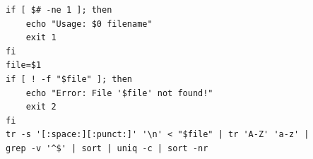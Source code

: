\begin{verbatim}
if [ $# -ne 1 ]; then
    echo "Usage: $0 filename"
    exit 1
fi
file=$1
if [ ! -f "$file" ]; then
    echo "Error: File '$file' not found!"
    exit 2
fi
tr -s '[:space:][:punct:]' '\n' < "$file" | tr 'A-Z' 'a-z' | 
grep -v '^$' | sort | uniq -c | sort -nr
\end{verbatim}